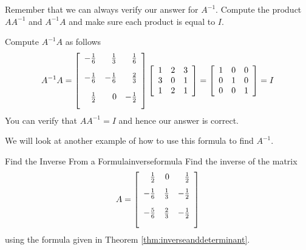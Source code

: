 \begin{solution}
Remember that we can always verify our answer for $A^{-1}$. Compute the product $AA^{-1}$ and $A^{-1}A$ and make
sure each product is equal to $I$.

Compute $A^{-1}A$ as follows
\begin{equation*}
A^{-1}A = 
\allowbreak \leftB
\begin{array}{rrr}
-\vspace{0.05in}\frac{1}{6} & \vspace{0.05in}\frac{1}{3} & \vspace{0.05in}
\frac{1}{6} \\
-\vspace{0.05in}\frac{1}{6} & -\vspace{0.05in}\frac{1}{6} & \vspace{0.05in}
\frac{2}{3} \\
\vspace{0.05in}\frac{1}{2} & 0 & -\vspace{0.05in}\frac{1}{2}
\end{array}
\rightB \leftB
\begin{array}{rrr}
1 & 2 & 3 \\
3 & 0 & 1 \\
1 & 2 & 1
\end{array}
\rightB = \leftB
\begin{array}{rrr}
1 & 0 & 0 \\
0 & 1 & 0 \\
0 & 0 & 1
\end{array}
\rightB
=
I
\end{equation*}
You can verify that $AA^{-1} = I$ and hence our answer is correct. 
\end{solution} 

We will look at another example of how to use this formula to find $A^{-1}$.

\begin{example}{Find the Inverse From a Formula}{inverseformula}
Find the inverse of the matrix
\begin{equation*}
A=\leftB
\begin{array}{rrr}
\vspace{0.05in}\frac{1}{2} & 0 & \vspace{0.05in}\frac{1}{2} \\
-\vspace{0.05in}\frac{1}{6} & \vspace{0.05in}\frac{1}{3} & -\vspace{0.05in}
\frac{1}{2} \\
-\vspace{0.05in}\frac{5}{6} & \vspace{0.05in}\frac{2}{3} & -\vspace{0.05in}
\frac{1}{2}
\end{array}
\rightB
\end{equation*}
using the formula given in Theorem \ref{thm:inverseanddeterminant}.
\end{example}

